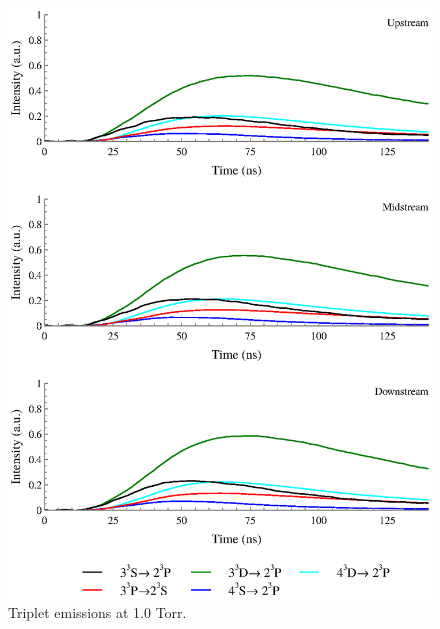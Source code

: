 \begin{figure}
  \centering
  \includegraphics{./chapters/extraem/figures/1torr_t.eps}
  \caption{Triplet emissions at 1.0 Torr.}
\end{figure}

